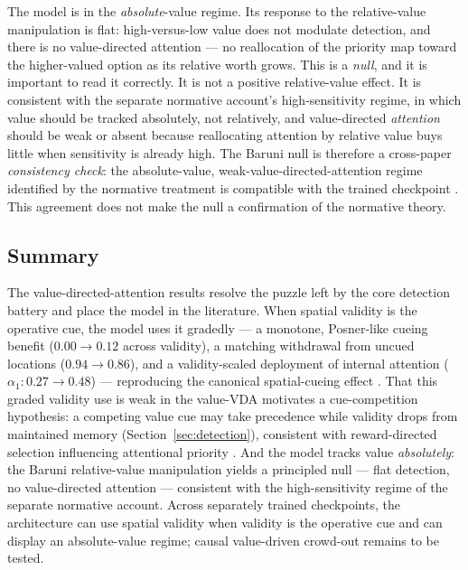 The model is in the \emph{absolute}-value regime. Its response to the relative-value
manipulation is flat: high-versus-low value does not modulate detection, and there
is no value-directed attention --- no reallocation of the priority map toward the
higher-valued option as its relative worth grows. This is a \emph{null}, and it is
important to read it correctly. It is not a positive relative-value effect. It is
consistent with the separate normative account's high-sensitivity regime, in which
value should be tracked absolutely, not relatively, and value-directed
\emph{attention} should be weak or absent because reallocating
attention by relative value buys little when sensitivity is already high. The Baruni
null is therefore a cross-paper \emph{consistency check}: the absolute-value,
weak-value-directed-attention regime identified by the normative treatment is
compatible with the trained checkpoint
\cite{failing_theeuwes2018_selection_history,morgan_albanna_herman2026_vda}. This
agreement does not make the null a confirmation of the normative theory.

\subsection{Summary}
\label{sec:value-summary}

The value-directed-attention results resolve the puzzle left by the core detection
battery and place the model in the literature. When spatial validity is the
operative cue, the model uses it gradedly --- a monotone, Posner-like cueing benefit
($0.00 \to 0.12$ across validity), a matching withdrawal from uncued locations
($0.94 \to 0.86$), and a validity-scaled deployment of internal attention
($\alpha_1: 0.27 \to 0.48$) --- reproducing the canonical spatial-cueing effect
\cite{posner1980_orienting, MullerFindlay1987}. That this graded validity use is
weak in the value-VDA motivates a cue-competition hypothesis: a competing value cue
may take precedence while validity drops from maintained memory
(Section~\ref{sec:detection}), consistent with reward-directed selection influencing
attentional priority \cite{failing_theeuwes2018_selection_history,
hickey2010_reward_salience_acc}. And the model tracks value \emph{absolutely}: the
Baruni relative-value manipulation yields a principled null --- flat detection, no
value-directed attention --- consistent with the high-sensitivity regime of the
separate normative account. Across separately trained checkpoints, the architecture
can use spatial validity when validity is the operative cue and can display an
absolute-value regime; causal value-driven crowd-out remains to be tested.
